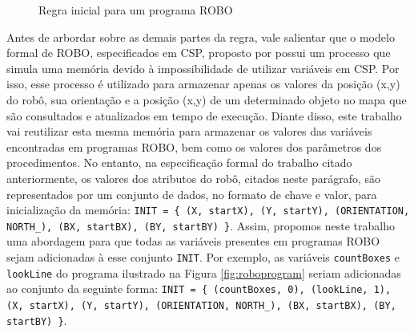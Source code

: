 \begin{figure}[h]
\centering
\caption{Regra inicial para um programa ROBO}

\label{fig:rules}
\end{figure}

Antes de arbordar sobre as demais partes da regra, vale salientar que o modelo formal de ROBO, especificados em CSP, proposto por \cite{nogueira} possui um processo que simula uma memória devido à impossibilidade de utilizar variáveis em CSP. Por isso, esse processo é utilizado para armazenar apenas os valores da posição (x,y) do robô, sua orientação e a posição (x,y) de um determinado objeto no mapa que são consultados e atualizados em tempo de execução. Diante disso, este trabalho vai reutilizar esta mesma memória para armazenar os valores das variáveis encontradas em programas ROBO, bem como os valores dos parâmetros dos procedimentos. No entanto, na especificação formal do trabalho citado anteriormente, os valores dos atributos do robô, citados neste parágrafo, são representados por um conjunto de dados, no formato de chave e valor, para inicialização da memória: \texttt{INIT = \{ (X, startX), (Y, startY), (ORIENTATION, NORTH\_), (BX, startBX), (BY, startBY) \}}. Assim, propomos neste trabalho uma abordagem para que todas as variáveis presentes em programas ROBO sejam adicionadas à esse conjunto \texttt{INIT}. Por exemplo, as variáveis \texttt{countBoxes} e \texttt{lookLine} do programa ilustrado na Figura \ref{fig:roboprogram} seriam adicionadas ao conjunto da seguinte forma: \texttt{INIT = \{ (countBoxes, 0), (lookLine, 1), (X, startX), (Y, startY), (ORIENTATION, NORTH\_), (BX, startBX), (BY, startBY) \}}. 

